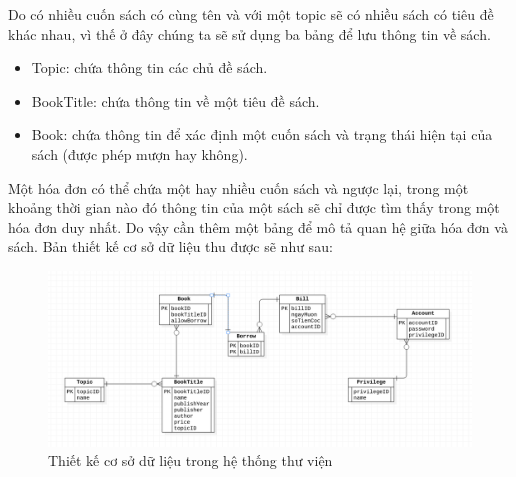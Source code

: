 Do có nhiều cuốn sách có cùng tên và với một topic sẽ có nhiều sách có tiêu đề khác nhau,
vì thế ở đây chúng ta sẽ sử dụng ba bảng để lưu thông tin về sách. 
\begin{itemize}
      \item Topic: chứa thông tin các chủ đề sách.
\item BookTitle: chứa thông tin về một tiêu đề sách.
\item Book: chứa thông tin để xác định một cuốn sách và trạng thái 
hiện tại của sách (được phép mượn hay không).

\end{itemize}


Một hóa đơn có thể chứa một hay nhiều cuốn sách và ngược lại, trong một khoảng 
thời gian nào đó thông tin của một sách sẽ chỉ được tìm thấy trong một hóa đơn duy nhất. 
Do vậy cần thêm một bảng để mô tả quan hệ giữa hóa đơn và sách.
 Bản thiết kế cơ sở dữ liệu thu được sẽ như sau:
\begin{figure}[H]
\centering
\includegraphics[width=\textwidth]{figures/db.png}
\caption{Thiết kế cơ sở dữ liệu trong hệ thống thư viện}
\end{figure}




